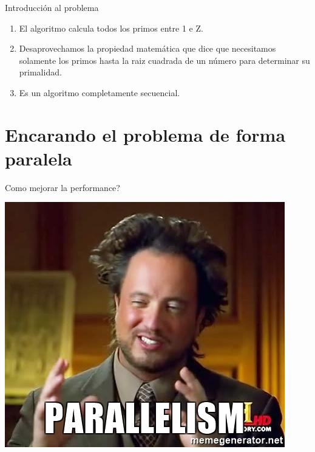 \documentclass[compress]{beamer}
\begin{document}
\begin{frame}{Introducci\'on al problema}
  \begin{enumerate}
    \setlength\itemsep{1em}
    \item<1-> El algoritmo calcula todos los primos entre 1 e Z.
    \item<2-> Desaprovechamos la propiedad matemática que dice que necesitamos solamente los primos hasta la raiz cuadrada de un número para determinar su primalidad.
    \item<3-> Es un algoritmo completamente secuencial.
  \end{enumerate}
\end{frame}

\section{Encarando el problema de forma paralela}

\begin{frame}{Como mejorar la performance?}
  \begin{center}
    \includegraphics[scale=0.75]{imagenes/parallelism.jpg}
  \end{center}
\end{frame}
\end{document}
